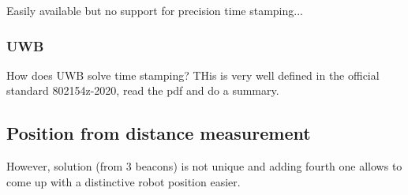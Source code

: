 Easily available but no support for precision time stamping...

\subsubsection{UWB}

How does UWB solve time stamping? THis is very well defined in the official standard 802154z-2020, read the pdf and do a summary.

\subsection{Position from distance measurement}

However, solution (from 3 beacons) is not unique and adding fourth one allows to come up with a distinctive robot position easier.